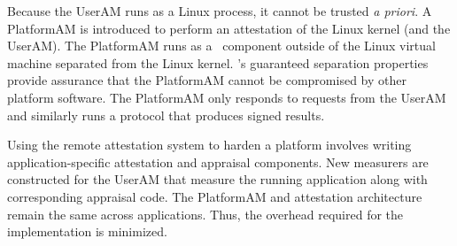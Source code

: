 Because the UserAM runs as a Linux process, it cannot be
trusted \emph{a priori}.  A PlatformAM is introduced to perform an
attestation of the Linux kernel (and the UserAM).  The Platform\-AM runs as a
\selFour \ component outside of the Linux virtual machine 
separated from the Linux kernel.  \selFour's guaranteed
separation properties provide assurance that the PlatformAM cannot be
compromised by other platform software.  The PlatformAM only
responds to requests from the UserAM and similarly runs a protocol
that produces signed results.

Using the remote attestation system to harden a platform involves
writing application-specific attestation and appraisal components.
New measurers are constructed for the UserAM that measure the running
application along with corresponding appraisal code.  The PlatformAM
and attestation architecture remain the same across applications.
Thus, the overhead required for the implementation is minimized.